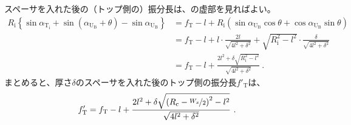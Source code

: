 スペーサを入れた後の（トップ側の）振分長は、の虚部を見ればよい。
\begin{align*}
  R_\mathrm i\left\{\sin\alpha_{\mathrm T_\mathrm i} + \sin(\alpha_{\mathrm U_\mathrm B} + \theta) - \sin\alpha_{\mathrm U_\mathrm B}\right\}
  &= f_\mathrm T -l
     +R_\mathrm i\left(\sin\alpha_{\mathrm U_\mathrm B}\cos\theta + \cos\alpha_{\mathrm U_\mathrm B}\sin\theta\right)\\
  &= f_\mathrm T -l+l\cdot\frac{2l}{\sqrt{4l^2+\delta^2}}
     +\sqrt{R_\mathrm i^2-l^2}\cdot\frac{\delta}{\sqrt{4l^2+\delta^2}}\\
  &= f_\mathrm T -l+\frac{2l^2+\delta\sqrt{R_\mathrm i^2-l^2}}{\sqrt{4l^2+\delta^2}}~.
\end{align*}
まとめると、厚さ$\delta$のスペーサを入れた後のトップ側の振分長$f'_\mathrm T$は、
\begin{align*}
  f'_\mathrm T
  = f_\mathrm T -l
    +\frac{2l^2+\delta\sqrt{\left(R_\mathrm c-\nicefrac{W_x}2\right)^2-l^2}}{\sqrt{4l^2+\delta^2}}~.
\end{align*}




